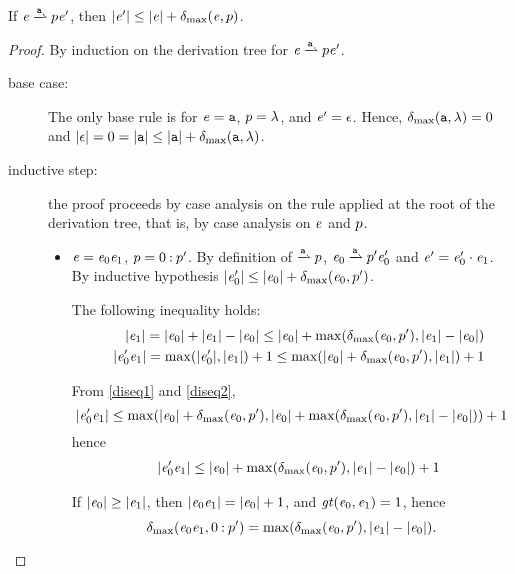 \begin{theorem}\label{inc-bound}
 If $\re\parDer{\sym}{\tpath}\re'$, then ${\mid}{\mathit {e}'}{\mid}\leq {\mid}{\ensuremath{\mathit {e}}}{\mid}+{\delta_{\max}}({\mathit {e}},{p})$.
 \begin{proof}
  By induction on the derivation tree for $\re\parDer{\sym}{\tpath}\re'$.
  \begin{description}
   \item[base case:] The only base rule is for $\mathit {e}=\mathtt {a}$, $p=\lambda$, and $\mathit {e}'=\mathtt {\epsilon}$.
    Hence, ${\delta_{\max}}({\mathtt {a}},{\lambda})=0$ and
    ${\mid}{\mathtt {\epsilon}}{\mid}=0={\mid}{\mathtt {a}}{\mid}\leq{\mid}{\ensuremath{\mathtt {a}}}{\mid}+{\delta_{\max}}({\mathtt {a}},{\lambda})$.
   \item[inductive step:] the proof proceeds by case analysis on the rule applied
    at the root of the derivation tree, that is, by case analysis on $\mathit {e}$ and $p$.
    \begin{itemize}
     \item $\mathit {e}=\mathit {e}_0\mathit {e}_1$, $p=0\mathbin{:}p'$. By definition
           of $\parDer{\sym}{\tpath}$, $\re_0\parDer{\sym}{\tpath'}\re'_0$ and $\mathit {e}'=\mathit {e}'_0\cdot\mathit {e}_1$.
           By inductive hypothesis ${\mid}{\mathit {e}'_0}{\mid}\leq {\mid}{\ensuremath{\mathit {e}}_0}{\mid}+{\delta_{\max}}({\mathit {e}_0},{p'})$.

           The following inequality holds:
           \begin{align}
             &  & {\mid}{\mathit {e}_1}{\mid}={\mid}{\mathit {e}_0}{\mid}+{\mid}{\mathit {e}_1}{\mid}-{\mid}{\mathit {e}_0}{\mid}\leq
            {\mid}{\ensuremath{\mathit {e}}_0}{\mid}+\max({\delta_{\max}}({\mathit {e}_0},{p'}),{\mid}{\mathit {e}_1}{\mid}-{\mid}{\mathit {e}_0}{\mid}) \label{diseq1} \\
             &  & {\mid}{\mathit {e}'_0\mathit {e}_1}{\mid}=\max({\mid}{\mathit {e}'_0}{\mid},{\mid}{\mathit {e}_1}{\mid})+1
            \leq\max({\mid}{\mathit {e}_0}{\mid}+{\delta_{\max}}({\mathit {e}_0},{p'}),{\mid}{\mathit {e}_1}{\mid})+1 \label{diseq2}
           \end{align}

           From \cref{diseq1} and \cref{diseq2},
           $$
            {\mid}{\mathit {e}'_0\mathit {e}_1}{\mid}\leq
            \max({\mid}{\mathit {e}_0}{\mid}+{\delta_{\max}}({\mathit {e}_0},{p'}),
            {\mid}{\mathit {e}_0}{\mid}+\max({\delta_{\max}}({\mathit {e}_0},{p'}),{\mid}{\mathit {e}_1}{\mid}-{\mid}{\mathit {e}_0}{\mid}))+1
           $$
           hence
           \begin{align}
             &  & {\mid}{\mathit {e}'_0\mathit {e}_1}{\mid}\leq
            {\mid}{\ensuremath{\mathit {e}}_0}{\mid}+\max({\delta_{\max}}({\mathit {e}_0},{p'}),{\mid}{\mathit {e}_1}{\mid}-{\mid}{\mathit {e}_0}{\mid})+1 \label{diseq3}
           \end{align}

           If ${\mid}{\mathit {e}_0}{\mid}\geq{\mid}{\ensuremath{\mathit {e}}_1}{\mid}$, then ${\mid}{\mathit {e}_0\mathit {e}_1}{\mid}={\mid}{\mathit {e}_0}{\mid}+1$, and
           $\mathit{gt}({\mathit {e}_0},{\mathit {e}_1})=1$, hence
           $${\delta_{\max}}({\mathit {e}_0\mathit {e}_1},{0\mathbin{:}p'})=\max({\delta_{\max}}({\mathit {e}_0},{p'}),{\mid}{\mathit {e}_1}{\mid}-{\mid}{\mathit {e}_0}{\mid}).$$


\end{itemize}
\end{description}
\end{proof}
\end{theorem}
